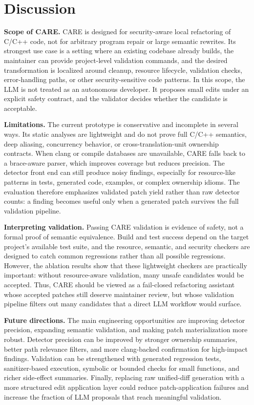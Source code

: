 \providecommand{\SysName}{CARE}

\section{Discussion}
\label{sec:discussion}

\noindent\textbf{Scope of \SysName{}.}
\SysName{} is designed for security-aware local refactoring of C/C++ code, not
for arbitrary program repair or large semantic rewrites. Its strongest use case
is a setting where an existing codebase already builds, the maintainer can
provide project-level validation commands, and the desired transformation is
localized around cleanup, resource lifecycle, validation checks, error-handling
paths, or other security-sensitive code patterns. In this scope, the LLM is not
treated as an autonomous developer. It proposes small edits under an explicit
safety contract, and the validator decides whether the candidate is acceptable.

\noindent\textbf{Limitations.}
The current prototype is conservative and incomplete in several ways. Its
static analyses are lightweight and do not prove full C/C++ semantics, deep
aliasing, concurrency behavior, or cross-translation-unit ownership contracts.
When clang or compile databases are unavailable, \SysName{} falls back to a
brace-aware parser, which improves coverage but reduces precision. The detector
front end can still produce noisy findings, especially for resource-like
patterns in tests, generated code, examples, or complex ownership idioms. The
evaluation therefore emphasizes validated patch yield rather than raw detector
counts: a finding becomes useful only when a generated patch survives the full
validation pipeline.

\noindent\textbf{Interpreting validation.}
Passing \SysName{} validation is evidence of safety, not a formal proof of
semantic equivalence. Build and test success depend on the target project's
available test suite, and the resource, semantic, and security checkers are
designed to catch common regressions rather than all possible regressions.
However, the ablation results show that these lightweight checkers are
practically important: without resource-aware validation, many unsafe candidates
would be accepted. Thus, \SysName{} should be viewed as a fail-closed
refactoring assistant whose accepted patches still deserve maintainer review,
but whose validation pipeline filters out many candidates that a direct LLM
workflow would surface.

\noindent\textbf{Future directions.}
The main engineering opportunities are improving detector precision, expanding
semantic validation, and making patch materialization more robust. Detector
precision can be improved by stronger ownership summaries, better path
relevance filters, and more clang-backed confirmation for high-impact findings.
Validation can be strengthened with generated regression tests, sanitizer-based
execution, symbolic or bounded checks for small functions, and richer
side-effect summaries. Finally, replacing raw unified-diff generation with a
more structured edit application layer could reduce patch-application failures
and increase the fraction of LLM proposals that reach meaningful validation.
